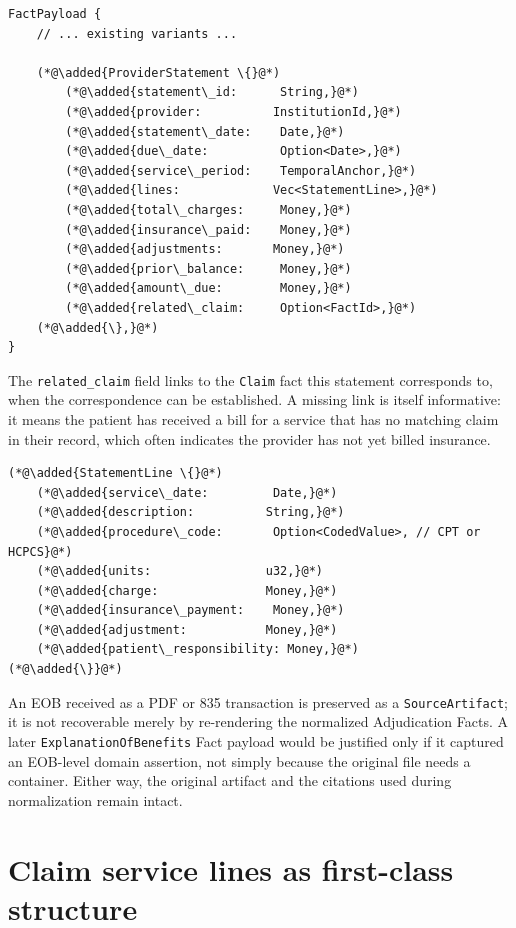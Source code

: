 \documentclass[11pt]{article}
\newcommand{\added}[1]{\textcolor{accentblue}{#1}}
\begin{document}
\begin{lstlisting}
FactPayload {
    // ... existing variants ...

    (*@\added{ProviderStatement \{}@*)
        (*@\added{statement\_id:      String,}@*)
        (*@\added{provider:          InstitutionId,}@*)
        (*@\added{statement\_date:    Date,}@*)
        (*@\added{due\_date:          Option<Date>,}@*)
        (*@\added{service\_period:    TemporalAnchor,}@*)
        (*@\added{lines:             Vec<StatementLine>,}@*)
        (*@\added{total\_charges:     Money,}@*)
        (*@\added{insurance\_paid:    Money,}@*)
        (*@\added{adjustments:       Money,}@*)
        (*@\added{prior\_balance:     Money,}@*)
        (*@\added{amount\_due:        Money,}@*)
        (*@\added{related\_claim:     Option<FactId>,}@*)
    (*@\added{\},}@*)
}
\end{lstlisting}

The \texttt{related\_claim} field links to the \texttt{Claim} fact this
statement corresponds to, when the correspondence can be established. A
missing link is itself informative: it means the patient has received a
bill for a service that has no matching claim in their record, which
often indicates the provider has not yet billed insurance.

\begin{lstlisting}
(*@\added{StatementLine \{}@*)
    (*@\added{service\_date:         Date,}@*)
    (*@\added{description:          String,}@*)
    (*@\added{procedure\_code:       Option<CodedValue>, // CPT or HCPCS}@*)
    (*@\added{units:                u32,}@*)
    (*@\added{charge:               Money,}@*)
    (*@\added{insurance\_payment:    Money,}@*)
    (*@\added{adjustment:           Money,}@*)
    (*@\added{patient\_responsibility: Money,}@*)
(*@\added{\}}@*)
\end{lstlisting}

An EOB received as a PDF or 835 transaction is preserved as a
\texttt{SourceArtifact}; it is not recoverable merely by re-rendering the
normalized Adjudication Facts. A later \texttt{ExplanationOfBenefits} Fact
payload would be justified only if it captured an EOB-level domain assertion,
not simply because the original file needs a container. Either way, the
original artifact and the citations used during normalization remain intact.

\section{Claim service lines as first-class structure}
\label{sec:claim-lines}
\end{document}
